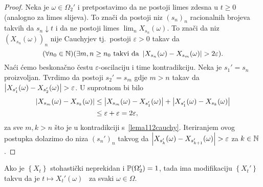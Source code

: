 \documentclass[main.tex]{subfiles}
\begin{document}
\begin{proof}
	Neka je \( \omega \in \Omega_2' \) i pretpostavimo da ne postoji limes zdesna u \( t \ge 0 \) (analogno za limes slijeva). To znači da postoji niz \( (s_n)_n \)
	racionalnih brojeva takvih da \( s_n \downarrow t \) i da ne postoji limes \( \lim_n X_{s_n}(\omega) \). To znači da niz \( (X_{s_n}(\omega))_n \) nije Cauchyjev tj.\ postoji
	\( \varepsilon > 0 \) takav da
	\begin{equation} \label{lema112cauchy}
		(\forall n_0 \in \N)(\exists m,n \ge n_0 \mathrm{\ takvi \ da \ } \abs{X_{s_n}(\omega) - X_{s_m}(\omega)} > 2\varepsilon ).
	\end{equation}
	Naći ćemo beskonačno čestu \( \varepsilon \)-oscilaciju i time kontradikciju. Neka je \( s_1' = s_n \) proizvoljan. Tvrdimo da postoji
	\( s_2' = s_m \) gdje \( m > n \) takav da \( \abs{X_{s_1'}(\omega) - X_{s_2'}(\omega)} > \varepsilon \). U suprotnom bi bilo
	\begin{equation}
		\begin{aligned}
			\abs{X_{s_m}(\omega) - X_{s_k}(\omega)} & \le \abs{X_{s_m}(\omega) - X_{s_1'}(\omega)} + \abs{X_{s_1'}(\omega) - X_{s_k}(\omega)} \\
			                                        & \le \varepsilon + \varepsilon = 2\varepsilon,
		\end{aligned}
	\end{equation}
	za sve \( m, k > n \) što je u kontradikciji s~\eqref{lema112cauchy}. Iteriranjem ovog postupka dolazimo do
	niza \( (s_n')_n \) takvog da \( \abs{X_{s_k'}(\omega) - X_{s_{k+1}'}(\omega)} > \varepsilon \) za \( k \in \N \).
\end{proof}

\begin{lema}\label{markovlema2}
	Ako je \( \left\{ X_t \right\} \) stohastički neprekidan i \( \P(\Omega_2') = 1 \), tada ima modifikaciju \( \left\{ X_t' \right\} \)
	takvu da je \( t \mapsto X_t'(\omega) \) \cadlag \ za svaki \( \omega \in \Omega \).
\end{lema}
\end{document}
